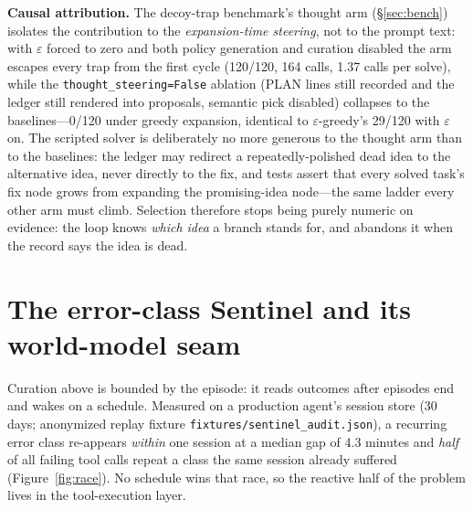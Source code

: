 \documentclass[11pt,a4paper]{article}
\newcommand{\hdr}[1]{\textbf{#1}}
\begin{document}
\hdr{Causal attribution.} The decoy-trap benchmark's thought arm
(\S\ref{sec:bench}) isolates the contribution to the \emph{expansion-time
steering}, not to the prompt text: with $\varepsilon$ forced to zero and
both policy generation and curation disabled the arm escapes every trap
from the first cycle (120/120, 164 calls, 1.37 calls per solve), while the
\texttt{thought\_steering=False} ablation (PLAN lines still recorded and the
ledger still rendered into proposals, semantic pick disabled) collapses to
the baselines---0/120 under greedy expansion, identical to
$\varepsilon$-greedy's 29/120 with $\varepsilon$ on. The scripted solver is
deliberately no more generous to the thought arm than to the baselines:
the ledger may redirect a repeatedly-polished dead idea to the alternative
idea, never directly to the fix, and tests assert that every solved task's
fix node grows from expanding the promising-idea node---the same ladder
every other arm must climb. Selection therefore stops being purely numeric
on evidence: the loop knows \emph{which idea} a branch stands for, and
abandons it when the record says the idea is dead.

\section{The error-class Sentinel and its world-model seam}
\label{sec:sentinel}

Curation above is bounded by the episode: it reads outcomes after episodes
end and wakes on a schedule. Measured on a production agent's session store
(30 days; anonymized replay fixture \texttt{fixtures/sentinel\_audit.json}),
a recurring error class re-appears \emph{within} one session at a median gap
of 4.3 minutes and \emph{half} of all failing tool calls repeat a class the
same session already suffered (Figure~\ref{fig:race}). No schedule wins that
race, so the reactive half of the problem lives in the tool-execution layer.
\end{document}
